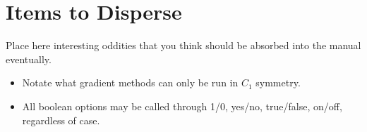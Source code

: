 \section{Items to Disperse} \label{sec:disperse}

Place here interesting oddities that you think should be absorbed into the manual eventually.

\begin{itemize}
\item Notate what gradient methods can only be run in $C_1$ symmetry.
\item All boolean options may be called through 1/0, yes/no, true/false, on/off, regardless of case.
\end{itemize}


